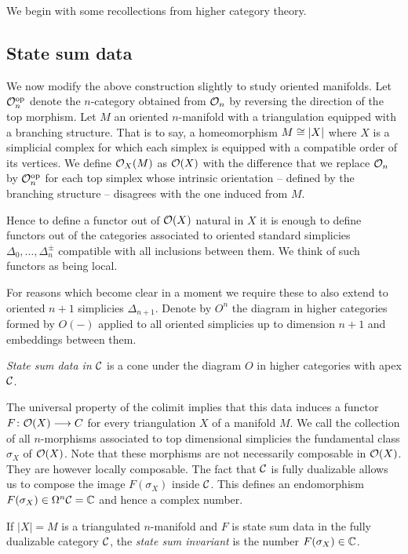 We begin with some recollections from higher category theory.

\subsection{State sum data}

We now modify the above construction slightly to study oriented manifolds.
Let $\mathcal{O}_n^{\mathrm{op}}$ denote the $n$-category obtained from $\mathcal{O}_n$ by reversing the direction of the top morphism.
Let $M$ an oriented $n$-manifold with a triangulation equipped with a branching structure.
That is to say, a homeomorphism $M \cong \lvert X\rvert$ where $X$ is a simplicial complex for which each simplex is equipped with a compatible order of its vertices.
We define $\mathcal{O}_X(M)$ as $\mathcal{O}(X)$ with the difference that we replace $\mathcal{O}_n$ by $\mathcal{O}_n^{\mathrm{op}}$ for each top simplex whose intrinsic orientation -- defined by the branching structure -- disagrees with the one induced from $M$.

Hence to define a functor out of $\mathcal{O}(X)$ natural in $X$ it is enough to define functors out of the categories associated to oriented standard simplicies $\Delta_0, \dots, \Delta_n^\pm$ compatible with all inclusions between them.
We think of such functors as being local.

For reasons which become clear in a moment we require these to also extend to oriented $n+1$ simplicies $\Delta_{n+1}$.
Denote by $O^n$ the diagram in higher categories formed by $O(-)$ applied to all oriented simplicies up to dimension $n+1$ and embeddings between them.

\begin{definition}
\label{def:statesum}
	\emph{State sum data in $\mathcal{C}$} is a cone under the diagram $O$ in higher categories with apex $\mathcal{C}$.
\end{definition}

The universal property of the colimit implies that this data induces a functor $F \colon \mathcal{O}(X) \longrightarrow C$ for every triangulation $X$ of a manifold $M$.
We call the collection of all $n$-morphisms associated to top dimensional simplicies the fundamental class $\sigma_X$ of $\mathcal{O}(X)$.
Note that these morphisms are not necessarily composable in $\mathcal{O}(X)$.
They are however locally composable.
The fact that $\mathcal{C}$ is fully dualizable
allows us to compose the image $F(\sigma_X)$ inside $\mathcal{C}$.
This defines an endomorphism
$F(\sigma_X)\in \Omega^n\mathcal{C}=\mathbb{C} $ and hence a complex number.

\begin{definition}
    \label{def:statesuminvariant}
If $|X| = M$ is a triangulated $n$-manifold and $F$ is state sum data in the fully dualizable category $\mathcal{C}$, the \emph{state sum invariant} is the number $F(\sigma_X) \in \mathbb{C}$.
\end{definition}

